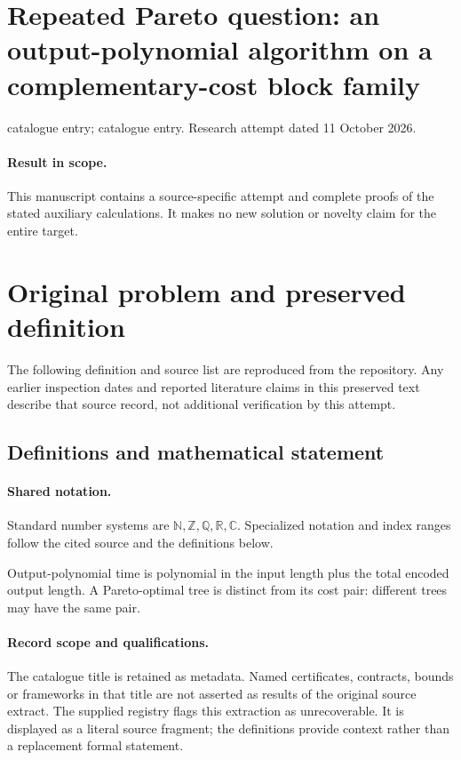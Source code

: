 \documentclass[11pt]{article}
\begin{document}
\section*{Repeated Pareto question: an output-polynomial algorithm on a complementary-cost block family}
\noindent catalogue entry; catalogue entry. Research attempt dated 11 October 2026.
\paragraph{Result in scope.}This manuscript contains a source-specific attempt and complete proofs of the stated auxiliary calculations. It makes no new solution or novelty claim for the entire target.
\section{Original problem and preserved definition}
The following definition and source list are reproduced from the repository. Any earlier inspection dates and reported literature claims in this preserved text describe that source record, not additional verification by this attempt.
\subsection{Definitions and mathematical statement}

\paragraph{Shared notation.}Standard number systems are $\mathbb N,\mathbb Z,\mathbb Q,\mathbb R,\mathbb C$. Specialized notation and index ranges follow the cited source and the definitions below.


Output-polynomial time is polynomial in the input length plus the total encoded output length. A Pareto-optimal tree is distinct from its cost pair: different trees may have the same pair.
\paragraph{Record scope and qualifications.}
The catalogue title is retained as metadata. Named certificates, contracts, bounds or frameworks in that title are not asserted as results of the original source extract.
The supplied registry flags this extraction as unrecoverable. It is displayed as a literal source fragment; the definitions provide context rather than a replacement formal statement.
\end{document}
